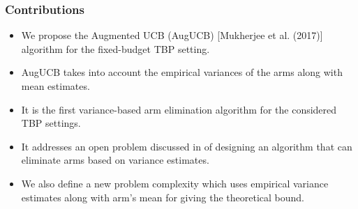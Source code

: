 \begin{frame}
\frametitle{Contributions}
\begin{itemize}
\item<1-> We propose the Augmented UCB (AugUCB) [{Mukherjee et al. (2017)}]  algorithm for the fixed-budget TBP setting.
\item<2-> AugUCB takes into account the empirical variances of the arms along with mean estimates.
\item<3-> It is the first variance-based arm elimination algorithm for the considered TBP settings. 
\item<4-> It addresses an open problem discussed in \cite{auer2010ucb} of designing an algorithm that can eliminate arms based on variance estimates.
\item<5-> We also define a new problem complexity which uses empirical variance estimates along with arm's mean for giving the theoretical bound.
\end{itemize}
\end{frame}


%


